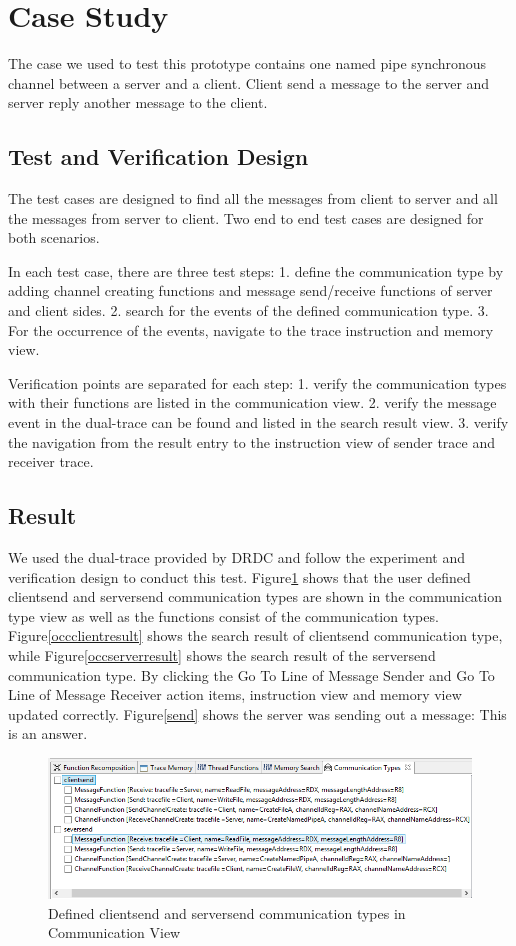\documentclass[paper=a4, fontsize=11pt]{scrartcl}
\numberwithin{equation}{section}		%
\numberwithin{figure}{section}			%
\numberwithin{table}{section}				%
\begin{document}
\section{Case Study}
The case we used to test this prototype contains one named pipe synchronous channel between a server and a client. Client send a message to the server and server reply another message to the client. 
\subsection{Test and Verification Design}
The test cases are designed to find all the messages from client to server and all the messages from server to client. Two end to end test cases are designed for both scenarios. 

In each test case, there are three test steps: 1. define the communication type by adding channel creating functions and message send/receive functions of server and client sides. 2. search for the events of  the defined communication type. 3. For the occurrence of the events, navigate to the trace instruction and memory view.

Verification points are separated for each step: 1. verify the communication types with their functions are listed in the communication view. 2. verify the message event in the dual-trace can be found and listed in the search result view. 3. verify the navigation from the result entry to the instruction view of sender trace and receiver trace.
\subsection{Result}
We used the dual-trace provided by DRDC and follow the experiment and verification design to conduct this test. Figure\ref{addcomtyperesult} shows that the user defined clientsend and serversend communication types are shown in the communication type view as well as the functions consist of the communication types. Figure\ref{occclientresult} shows the search result of clientsend communication type, while Figure\ref{occserverresult} shows the search result of the serversend communication type. By clicking the Go To Line of Message Sender and Go To Line of Message Receiver action items, instruction view and memory view updated correctly. Figure\ref{send} shows the server was sending out a message: This is an answer.


\begin{figure}[h]
\includegraphics[scale=.72]{addcomtyperesult}
 \caption{Defined clientsend and serversend communication types in Communication View}
\label{addcomtyperesult}
\end{figure}
\end{document}
